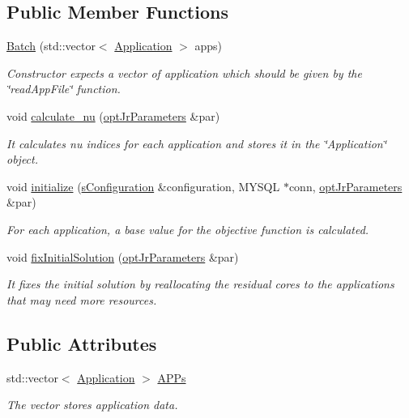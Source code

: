 \subsection*{Public Member Functions}
\begin{DoxyCompactItemize}
\item 
\hyperlink{classBatch_aea459d16c99c2f02af53b3ad5b0ff12d}{Batch} (std\-::vector$<$ \hyperlink{classApplication}{Application} $>$ apps)
\begin{DoxyCompactList}\small\item\em Constructor expects a vector of application which should be given by the \char`\"{}read\-App\-File\char`\"{} function. \end{DoxyCompactList}\item 
void \hyperlink{classBatch_a14f132321413b45d6446200807451414}{calculate\-\_\-nu} (\hyperlink{classoptJrParameters}{opt\-Jr\-Parameters} \&par)
\begin{DoxyCompactList}\small\item\em It calculates nu indices for each application and stores it in the \char`\"{}\-Application\char`\"{} object. \end{DoxyCompactList}\item 
void \hyperlink{classBatch_ae212d22fa812b51160f57507242152c1}{initialize} (\hyperlink{readConfigurationFile_8hh_ab8f35b1da3261263c5e9c0e7c8921f5c}{s\-Configuration} \&configuration, M\-Y\-S\-Q\-L $\ast$conn, \hyperlink{classoptJrParameters}{opt\-Jr\-Parameters} \&par)
\begin{DoxyCompactList}\small\item\em For each application, a base value for the objective function is calculated. \end{DoxyCompactList}\item 
void \hyperlink{classBatch_ac50dad870490ca7c60e0e15d86c02614}{fix\-Initial\-Solution} (\hyperlink{classoptJrParameters}{opt\-Jr\-Parameters} \&par)
\begin{DoxyCompactList}\small\item\em It fixes the initial solution by reallocating the residual cores to the applications that may need more resources. \end{DoxyCompactList}\end{DoxyCompactItemize}
\subsection*{Public Attributes}
\begin{DoxyCompactItemize}
\item 
std\-::vector$<$ \hyperlink{classApplication}{Application} $>$ \hyperlink{classBatch_a757bf1a36fee46b1b47263ab4a59c560}{A\-P\-Ps}
\begin{DoxyCompactList}\small\item\em The vector stores application data. \end{DoxyCompactList}\end{DoxyCompactItemize}



